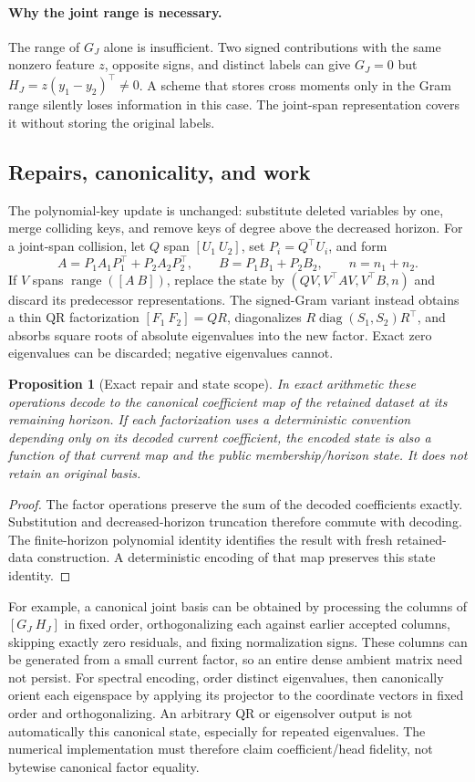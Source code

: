\documentclass[11pt,a4paper]{article}
\newtheorem{proposition}[theorem]{Proposition}
\begin{document}
\paragraph{Why the joint range is necessary.}
The range of $G_J$ alone is insufficient. Two signed contributions with the
same nonzero feature $z$, opposite signs, and distinct labels can give
$G_J=0$ but $H_J=z(y_1-y_2)^\top\ne0$. A scheme that stores cross moments
only in the Gram range silently loses information in this case. The
joint-span representation covers it without storing the original labels.

\subsection{Repairs, canonicality, and work}
The polynomial-key update is unchanged: substitute deleted variables by one,
merge colliding keys, and remove keys of degree above the decreased horizon.
For a joint-span collision, let $Q$ span $[U_1\ U_2]$, set
$P_i=Q^\top U_i$, and form
\[
 A=P_1A_1P_1^\top+P_2A_2P_2^\top,\qquad
 B=P_1B_1+P_2B_2,\qquad n=n_1+n_2.
\]
If $V$ spans $\operatorname{range}([A\ B])$, replace the state by
$(QV,V^\top AV,V^\top B,n)$ and discard its predecessor representations.
The signed-Gram variant instead obtains a thin QR factorization
$[F_1\ F_2]=QR$, diagonalizes
$R\operatorname{diag}(S_1,S_2)R^\top$, and absorbs square roots of absolute
eigenvalues into the new factor. Exact zero eigenvalues can be discarded;
negative eigenvalues cannot.

\begin{proposition}[Exact repair and state scope]
In exact arithmetic these operations decode to the canonical coefficient
map of the retained dataset at its remaining horizon. If each factorization
uses a deterministic convention depending only on its decoded current
coefficient, the encoded state is also a function of that current map and
the public membership/horizon state. It does not retain an original basis.
\end{proposition}
\begin{proof}
The factor operations preserve the sum of the decoded coefficients exactly.
Substitution and decreased-horizon truncation therefore commute with
decoding. The finite-horizon polynomial identity identifies the result with
fresh retained-data construction. A deterministic encoding of that map
preserves this state identity.
\end{proof}

For example, a canonical joint basis can be obtained by processing the
columns of $[G_J\ H_J]$ in fixed order, orthogonalizing each against earlier
accepted columns, skipping exactly zero residuals, and fixing normalization
signs. These columns can be generated from a small current factor, so an
entire dense ambient matrix need not persist. For spectral encoding, order
distinct eigenvalues, then canonically orient each eigenspace by applying
its projector to the coordinate vectors in fixed order and orthogonalizing.
An arbitrary QR or eigensolver output is not automatically this canonical
state, especially for repeated eigenvalues. The numerical implementation
must therefore claim coefficient/head fidelity, not bytewise canonical
factor equality.
\end{document}
